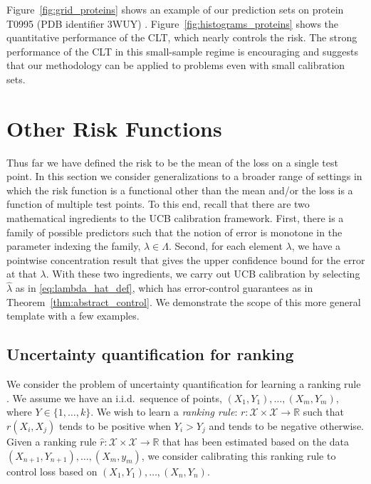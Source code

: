 \documentclass[10pt]{article}
\def\R{\mathbb{R}}
\newcommand{\X}{\mathcal{X}}
\begin{document}
Figure~\ref{fig:grid_proteins} shows an example of our prediction sets on protein T0995 (PDB identifier 3WUY) \cite{zhang2014structural}.
Figure~\ref{fig:histograms_proteins} shows the quantitative performance of the CLT, which nearly controls the risk.
The strong performance of the CLT in this small-sample regime is encouraging and suggests that our methodology can be applied to problems even with small calibration sets.

\section{Other Risk Functions}
Thus far we have defined the risk to be the mean of the loss on a single test point. In this section we consider generalizations to a broader range of settings in which the risk function is a functional other than the mean and/or the loss is a function of multiple test points. To this end, recall that there are two mathematical ingredients to the UCB calibration framework. First, there is a family of possible predictors such that the notion of error is monotone in the parameter indexing the family, $\lambda \in \Lambda$. Second, for each element $\lambda$, we have a pointwise concentration result that gives the upper confidence bound for the error at that $\lambda$. With these two ingredients, we carry out UCB calibration by selecting $\hat{\lambda}$ as in \eqref{eq:lambda_hat_def}, which has error-control guarantees as in Theorem~\ref{thm:abstract_control}.
We demonstrate the scope of this more general template with a few examples.

\subsection{Uncertainty quantification for ranking}
\label{subsec:ranking}

We consider the problem of uncertainty quantification for learning a ranking rule \cite[see, e.g.,][]{clemencon2008}. We assume we have an i.i.d.\ sequence of points, $(X_1,Y_1),\dots, (X_m, Y_m)$, where $Y \in \{1,\dots,k\}$. We wish to learn a \emph{ranking rule}: $r: \X \times \X \to \R$ such that $r(X_i, X_j)$ tends to be positive when $Y_i > Y_j$ and tends to be negative otherwise. Given a ranking rule $\hat{r} : \X \times \X \to \R$ that has been estimated based on the data $(X_{n+1}, Y_{n+1}), \dots, (X_m, y_m)$, we consider calibrating this ranking rule to control loss based on $(X_1,Y_1),\dots,(X_n, Y_n)$.
\end{document}
